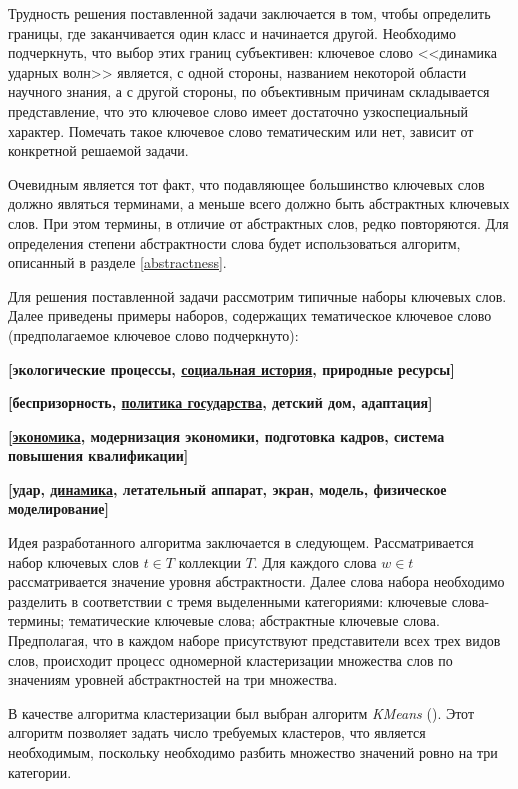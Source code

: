 Трудность решения поставленной задачи заключается в том, чтобы определить границы, где заканчивается один класс и начинается другой. Необходимо подчеркнуть, что выбор этих границ субъективен: ключевое слово <<динамика ударных волн>> является, с одной стороны, названием некоторой области научного знания, а с другой стороны, по объективным причинам складывается представление, что это ключевое слово имеет достаточно узкоспециальный характер. Помечать такое ключевое слово тематическим или нет, зависит от конкретной решаемой задачи.  

Очевидным является тот факт, что подавляющее большинство ключевых слов должно являться терминами, а меньше всего должно быть абстрактных ключевых слов. При этом термины, в отличие от абстрактных слов, редко повторяются. Для определения степени абстрактности слова будет
использоваться алгоритм, описанный в разделе \ref{abstractness}.

Для решения поставленной задачи рассмотрим типичные наборы ключевых слов. Далее приведены примеры наборов, содержащих тематическое ключевое слово (предполагаемое ключевое слово подчеркнуто):

\textbf{[экологические процессы, \underline{социальная история}, природные ресурсы]}\

\textbf{[беспризорность, \underline{политика государства}, детский дом, адаптация]}\

\textbf{[\underline{экономика}, модернизация экономики, подготовка кадров, система повышения
квалификации]}\

\textbf{[удар, \underline{динамика}, летательный аппарат, экран, модель, физическое моделирование]}\




Идея разработанного алгоритма заключается в следующем. Рассматривается набор ключевых слов $t \in T$ коллекции $T$. Для каждого слова $w \in t$  рассматривается значение уровня абстрактности. Далее слова набора необходимо разделить в соответствии с тремя выделенными категориями: ключевые слова-термины; тематические ключевые слова; абстрактные ключевые слова. Предполагая, что в каждом наборе присутствуют представители всех трех видов слов, происходит процесс одномерной кластеризации множества слов по значениям уровней абстрактностей на три множества.


В качестве алгоритма кластеризации был выбран алгоритм \emph{KMeans} (\cite{kmeans}). Этот алгоритм позволяет задать число требуемых кластеров, что является необходимым, поскольку необходимо разбить множество значений ровно на три категории.

